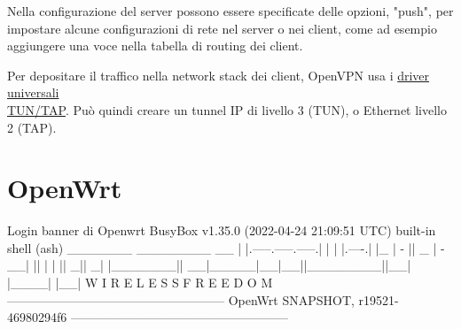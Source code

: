 Nella configurazione del server possono essere specificate delle opzioni, "push", per impostare alcune configurazioni di rete nel server o nei client, come ad esempio aggiungere una voce nella tabella di routing dei client.



Per depositare il traffico nella network stack dei client, OpenVPN usa i \href{https://docs.kernel.org/networking/tuntap.html}{driver universali \\TUN/TAP}. Può quindi creare un tunnel IP di livello 3 (TUN), o Ethernet livello 2 (TAP).


\section{OpenWrt}

\begin{bashcode}{Login banner di Openwrt}{}
BusyBox v1.35.0 (2022-04-24 21:09:51 UTC) built-in shell (ash)
_______                     ________        __
|       |.-----.-----.-----.|  |  |  |.----.|  |_
|   -   ||  _  |  -__|     ||  |  |  ||   _||   _|
|_______||   __|_____|__|__||________||__|  |____|
|__| W I R E L E S S   F R E E D O M
-----------------------------------------------------
OpenWrt SNAPSHOT, r19521-46980294f6
-----------------------------------------------------
\end{bashcode}

